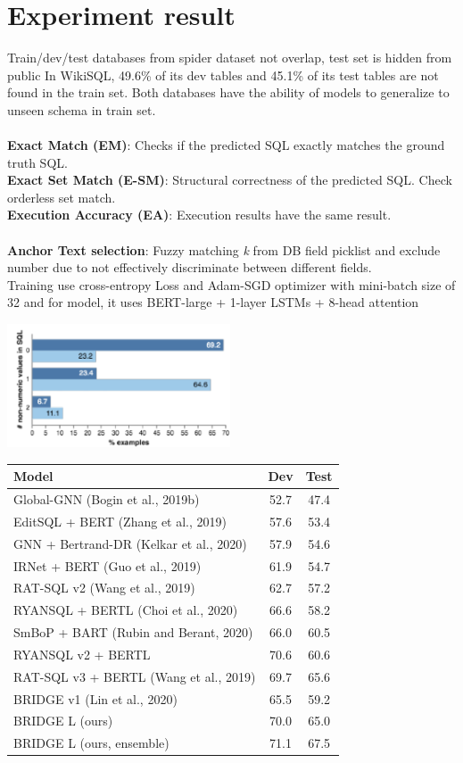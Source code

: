 \documentclass[10pt,a4paper]{article}
\begin{document}
\section{Experiment result}
Train/dev/test databases from spider dataset not overlap, test set is hidden from public
In WikiSQL, 49.6\% of its dev tables and 45.1\% of its test tables are not found in the train set. Both databases have the ability of models to generalize to unseen schema in train set.\\\\
\textbf{Exact Match (EM)}: Checks if the predicted SQL exactly matches the ground truth SQL.\\
\textbf{Exact Set Match (E-SM)}: Structural correctness of the predicted SQL. Check orderless set match.\\
\textbf{Execution Accuracy (EA)}: Execution results have the same result.\\\\
\textbf{Anchor Text selection}: Fuzzy matching \emph{k} from DB field picklist and exclude number due to not effectively discriminate between different fields. \\
Training use cross-entropy Loss and Adam-SGD optimizer with mini-batch size of 32 and
for model, it uses BERT-large + 1-layer LSTMs + 8-head attention

\includegraphics[scale=1.5]{non-numeric}

\begin{tabular}{ |l|c|c| }
\hline
  Model & Dev & Test \\
\hline
  Global-GNN (Bogin et al., 2019b) & 52.7 & 47.4 \\
  EditSQL + BERT (Zhang et al., 2019) & 57.6 & 53.4 \\
  GNN + Bertrand-DR (Kelkar et al., 2020) & 57.9 & 54.6 \\
  IRNet + BERT (Guo et al., 2019) & 61.9 & 54.7 \\
  RAT-SQL v2 (Wang et al., 2019) & 62.7 & 57.2 \\
  RYANSQL + BERTL (Choi et al., 2020) & 66.6 & 58.2 \\
  SmBoP + BART (Rubin and Berant, 2020) & 66.0 & 60.5 \\
  RYANSQL v2 + BERTL & 70.6 & 60.6 \\
  RAT-SQL v3 + BERTL (Wang et al., 2019) & 69.7 & 65.6 \\
  BRIDGE v1 (Lin et al., 2020) & 65.5 & 59.2 \\
  BRIDGE L (ours) & 70.0 & 65.0 \\
  BRIDGE L (ours, ensemble) & 71.1 & 67.5 \\
\hline
\end{tabular}
\end{document}
